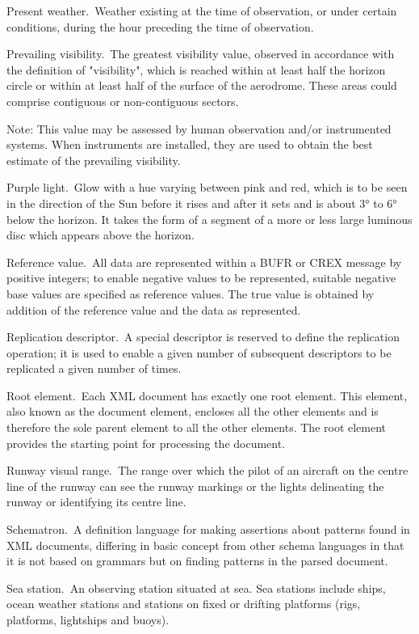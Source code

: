 Present weather. Weather existing at the time of observation, or under certain conditions, during the hour preceding the time of observation.

Prevailing visibility. The greatest visibility value, observed in accordance with the definition of "visibility", which is reached within at least half the horizon circle or within at least half of the surface of the aerodrome. These areas could comprise contiguous or non-contiguous sectors.

Note: This value may be assessed by human observation and/or instrumented systems. When instruments are installed, they are used to obtain the best estimate of the prevailing visibility.

Purple light. Glow with a hue varying between pink and red, which is to be seen in the direction of the Sun before it rises and after it sets and is about 3° to 6° below the horizon. It takes the form of a segment of a more or less large luminous disc which appears above the horizon.

Reference value. All data are represented within a BUFR or CREX message by positive integers; to enable negative values to be represented, suitable negative base values are specified as reference values. The true value is obtained by addition of the reference value and the data as represented.

Replication descriptor. A special descriptor is reserved to define the replication operation; it is used to enable a given number of subsequent descriptors to be replicated a given number of times.

Root element. Each XML document has exactly one root element. This element, also known as the document element, encloses all the other elements and is therefore the sole parent element to all the other elements. The root element provides the starting point for processing the document.

Runway visual range. The range over which the pilot of an aircraft on the centre line of the runway can see the runway markings or the lights delineating the runway or identifying its centre line.

Schematron. A definition language for making assertions about patterns found in XML documents, differing in basic concept from other schema languages in that it is not based on grammars but on finding patterns in the parsed document.

Sea station. An observing station situated at sea. Sea stations include ships, ocean weather stations and stations on fixed or drifting platforms (rigs, platforms, lightships and buoys).

